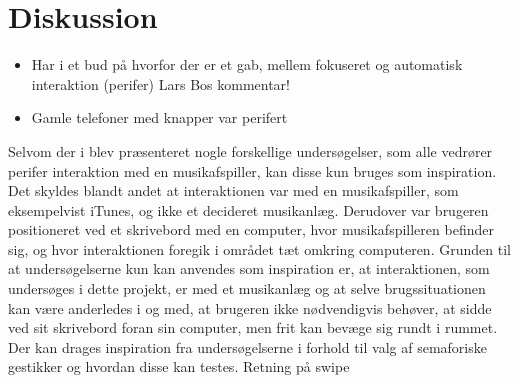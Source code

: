 \chapter{Diskussion}
\label{Samlet Diskussion}
%
\begin{itemize}
  \item Har i et bud på hvorfor der er et gab, mellem fokuseret og automatisk interaktion (perifer) Lars Bos kommentar!
  \item Gamle telefoner med knapper var perifert
\end{itemize}
%
Selvom der i  blev præsenteret nogle forskellige undersøgelser, som alle vedrører perifer interaktion med en musikafspiller, kan disse kun bruges som inspiration. Det skyldes blandt andet at interaktionen var med en musikafspiller, som eksempelvist iTunes, og ikke et decideret musikanlæg. Derudover var brugeren positioneret ved et skrivebord med en computer, hvor musikafspilleren befinder sig, og hvor interaktionen foregik i området tæt omkring computeren. Grunden til at undersøgelserne kun kan anvendes som inspiration er, at interaktionen, som undersøges i dette projekt, er med et musikanlæg og at selve brugssituationen kan være anderledes i og med, at brugeren ikke nødvendigvis behøver, at sidde ved sit skrivebord foran sin computer, men frit kan bevæge sig rundt i rummet. Der kan drages inspiration fra undersøgelserne i forhold til valg af semaforiske gestikker og hvordan disse kan testes.\blankline
%
Retning på swipe 
